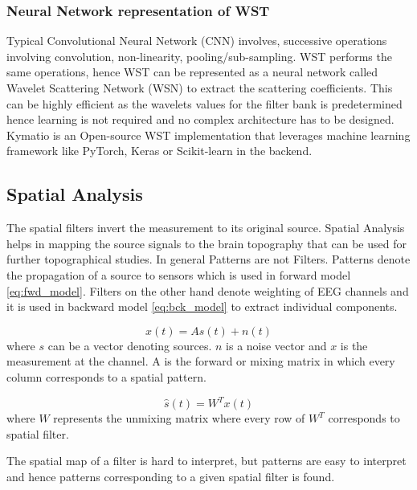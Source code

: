 \subsubsection{Neural Network representation of WST}
 Typical Convolutional Neural Network (CNN)  involves, successive operations involving convolution, non-linearity, pooling/sub-sampling. WST performs the same operations, hence WST can be represented as a neural network called Wavelet Scattering Network (WSN)  to extract the scattering coefficients. This can be highly efficient as the wavelets values for the filter bank is predetermined hence learning is not required and no complex architecture has to be designed. Kymatio is an Open-source WST implementation that leverages machine learning framework like PyTorch, Keras or Scikit-learn in the backend.

\subsection{Spatial Analysis}
The spatial filters invert the measurement to its original source. Spatial Analysis helps in mapping the source signals to the brain topography that can be used for further topographical studies. In general Patterns are not Filters. Patterns denote the propagation of a source to sensors which is used in forward model \ref*{eq:fwd_model}. Filters on the other hand denote weighting of EEG channels and it is used in backward model \ref*{eq:bck_model} to extract individual components.

\begin{equation} \label{eq:fwd_model}
    x(t) = A s(t) +n(t)
\end{equation}
where $s$ can be a vector denoting sources. $n$ is a noise vector and $x$ is the measurement at the channel. A is the forward or mixing matrix in which every column corresponds to a spatial pattern.

\begin{equation} \label{eq:bck_model}
    \hat{s}(t) = W^T x(t)
\end{equation}
where $W$ represents the unmixing matrix where every row of $W^T$ corresponds to spatial filter.

The spatial map of a filter is hard to interpret, but patterns are easy to interpret and hence patterns corresponding to a given spatial filter is found.

